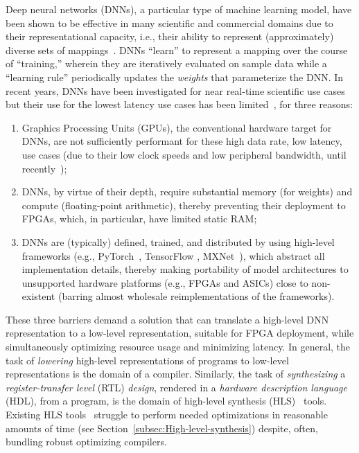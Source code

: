 \documentclass[10pt]{sig-alternate}
\begin{document}
Deep neural networks (DNNs), a particular type of machine learning
model, have been shown to be effective in many scientific and commercial
domains due to their representational capacity, i.e., their ability to represent (approximately) diverse sets of mappings~\cite{alzubaidi2021review}.
DNNs ``learn'' to represent a mapping over the course of ``training,''
wherein they are iteratively evaluated on sample data while a ``learning
rule'' periodically updates the \emph{weights} that parameterize
the DNN. In recent years, DNNs have been investigated for near real-time
scientific use cases~\cite{liu2019deep,patton2018167,liu2022exploring}
but their use for the lowest latency use cases has been limited~\cite{Duarte_2018},
for three reasons:
\begin{enumerate}
\item Graphics Processing Units (GPUs), the conventional hardware target
for DNNs, are not sufficiently performant for
these high data rate, low latency, use cases (due to their
low clock speeds and low peripheral bandwidth, until recently~\cite{aaij2020allen});
\item DNNs, by virtue of their depth, require substantial memory (for weights) and compute (floating-point arithmetic),
thereby preventing their deployment to FPGAs, which, in particular,
have limited static RAM;
\item DNNs are (typically) defined, trained, and distributed by using high-level
frameworks (e.g., PyTorch~\cite{paszke2017automatic}, TensorFlow
\cite{https://doi.org/10.48550/arxiv.1603.04467}, MXNet~\cite{https://doi.org/10.48550/arxiv.1512.01274}),
which abstract all implementation details, thereby making
portability of model architectures to unsupported hardware platforms (e.g., FPGAs and ASICs) close to non-existent (barring almost wholesale reimplementations of the frameworks).
\end{enumerate}

These three barriers demand a solution that can translate a high-level DNN representation to a low-level representation,
suitable for FPGA deployment, while simultaneously optimizing resource usage and
minimizing latency. In general, the task of \emph{lowering} high-level
representations of programs to low-level representations is the domain
of a compiler. Similarly, the task of \emph{synthesizing} a \emph{register-transfer level} (RTL) \emph{design}, rendered in a \emph{hardware
description language} (HDL), from a program, is the domain of high-level
synthesis (HLS)~\cite{7368920} tools. Existing HLS tools~\cite{10.1145/2514740,Zhang2008,ferrandi2021bambu} struggle
to perform needed optimizations in reasonable amounts
of time (see Section~\ref{subsec:High-level-synthesis}) despite,
often, bundling robust optimizing compilers.
\end{document}

